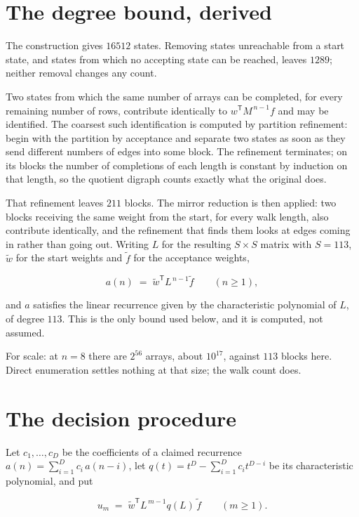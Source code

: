 \documentclass[11pt]{article}
\theoremstyle{definition}
\begin{document}
\section{The degree bound, derived}

The construction gives $16512$ states. Removing states unreachable from a start state, and states from which no accepting state can be reached, leaves $1289$; neither removal changes any count.

Two states from which the same number of arrays can be completed, for every remaining number of rows, contribute identically to $w^{\mathsf T}M^{\,n-1}f$ and may be identified. The coarsest such identification is computed by partition refinement: begin with the partition by acceptance and separate two states as soon as they send different numbers of edges into some block. The refinement terminates; on its blocks the number of completions of each length is constant by induction on that length, so the quotient digraph counts exactly what the original does.

That refinement leaves $211$ blocks. The mirror reduction is then applied: two blocks receiving the same weight from the start, for every walk length, also contribute identically, and the refinement that finds them looks at edges coming in rather than going out. Writing $L$ for the resulting $S \times S$ matrix with $S = 113$, $\tilde w$ for the start weights and $\tilde f$ for the acceptance weights,

\[a(n) \;=\; \tilde w^{\mathsf T} L^{\,n-1} \tilde f \qquad (n \ge 1),\]

and $a$ satisfies the linear recurrence given by the characteristic polynomial of $L$, of degree $113$. This is the only bound used below, and it is computed, not assumed.

For scale: at $n = 8$ there are $2^{56}$ arrays, about $10^{17}$, against $113$ blocks here. Direct enumeration settles nothing at that size; the walk count does.

\section{The decision procedure}

Let $c_1,\dots,c_D$ be the coefficients of a claimed recurrence $a(n) = \sum_{i=1}^{D} c_i\,a(n-i)$, let $q(t) = t^{D} - \sum_{i=1}^{D} c_i t^{D-i}$ be its characteristic polynomial, and put

\[u_m \;=\; \tilde w^{\mathsf T} L^{\,m-1} q(L)\,\tilde f \qquad (m \ge 1).\]
\end{document}

